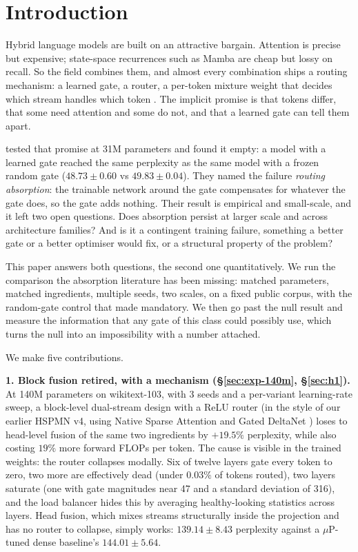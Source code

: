 \documentclass[11pt,a4paper]{article}
\begin{document}
\section{Introduction}
\label{sec:intro}

Hybrid language models are built on an attractive bargain. Attention is
precise but expensive; state-space recurrences such as Mamba are cheap but
lossy on recall. So the field combines them, and almost every combination
ships a routing mechanism: a learned gate, a router, a per-token mixture
weight that decides which stream handles which token
\citep{hymba,jamba,mor}. The implicit promise is that tokens differ, that
some need attention and some do not, and that a learned gate can tell them
apart.

\citet{absorption2026} tested that promise at 31M parameters and found it
empty: a model with a learned gate reached the same perplexity as the same
model with a frozen random gate ($48.73 \pm 0.60$ vs $49.83 \pm 0.04$).
They named the failure \emph{routing absorption}: the trainable network
around the gate compensates for whatever the gate does, so the gate adds
nothing. Their result is empirical and small-scale, and it left two open
questions. Does absorption persist at larger scale and across architecture
families? And is it a contingent training failure, something a better gate
or a better optimiser would fix, or a structural property of the problem?

This paper answers both questions, the second one quantitatively. We run
the comparison the absorption literature has been missing: matched
parameters, matched ingredients, multiple seeds, two scales, on a fixed
public corpus, with the random-gate control that \citet{absorption2026}
made mandatory. We then go past the null result and measure the
information that any gate of this class could possibly use, which turns
the null into an impossibility with a number attached.

We make five contributions.

\textbf{1. Block fusion retired, with a mechanism (\S\ref{sec:exp-140m},
\S\ref{sec:h1}).} At 140M parameters on wikitext-103, with 3 seeds and a
per-variant learning-rate sweep, a block-level dual-stream design with a
ReLU router (in the style of our earlier HSPMN v4, using Native Sparse
Attention \citep{nsa} and Gated DeltaNet \citep{gateddeltanet}) loses to head-level fusion of the same two ingredients by
$+19.5\%$ perplexity, while also costing $19\%$ more forward FLOPs per
token. The cause is visible in the trained weights: the router collapses
modally. Six of twelve layers gate every token to zero, two more are
effectively dead (under $0.03\%$ of tokens routed), two layers
saturate (one with gate magnitudes near 47 and a standard deviation of
316), and the load balancer hides this by averaging healthy-looking
statistics across layers. Head fusion, which mixes streams structurally
inside the projection and has no router to collapse, simply works:
$139.14 \pm 8.43$ perplexity against a $\mu$P-tuned dense baseline's
$144.01 \pm 5.64$.
\end{document}
